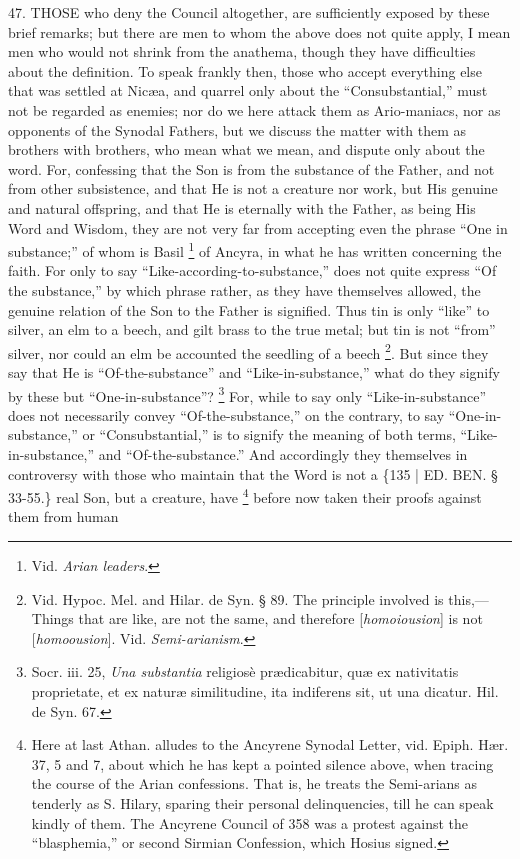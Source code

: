 47. THOSE
who deny the Council altogether, are sufficiently exposed by these
brief remarks; but there are men to whom the above does not quite
apply, I mean men who would not shrink from the anathema, though they
have difficulties about the definition. To speak frankly then, those
who accept everything else that was settled at Nicæa, and
quarrel only about the ``Consubstantial,'' must not be regarded as
enemies; nor do we here attack them as Ario-maniacs, nor as opponents
of the Synodal Fathers, but we discuss the matter with them as
brothers with brothers, who mean what we mean, and dispute only about
the word. For, confessing that the Son is from the substance of the
Father, and not from other subsistence, and that He is not a creature
nor work, but His genuine and natural offspring, and that He is
eternally with the Father, as being His Word and Wisdom, they are not
very far from accepting even the phrase ``One in substance;'' of whom is
Basil \footnote{Vid. \emph{Arian leaders}.} of Ancyra, in
what he has written concerning the faith. For only to say ``Like-according-to-substance,''
does not quite express ``Of the substance,'' by which phrase rather, as
they have themselves allowed, the genuine relation of the Son to the
Father is signified. Thus tin is only ``like'' to silver, an elm to a
beech, and gilt brass to the true metal; but tin is not ``from'' silver,
nor could an elm be accounted the seedling of a beech \footnote{Vid. Hypoc. Mel. and Hilar. de Syn. § 89. The principle involved is
this,—Things that are like, are not the same, and therefore [\emph{homoiousion}]
is not [\emph{homoousion}]. Vid. \emph{Semi-arianism}.}. But since they say that He is ``Of-the-substance'' and ``Like-in-substance,''
what do they signify by these but ``One-in-substance''? \footnote{Socr. iii. 25, \emph{Una substantia} religiosè prædicabitur, quæ ex
nativitatis proprietate, et ex naturæ similitudine, ita indiferens
sit, ut una dicatur. Hil. de Syn. 67.} For, while to say only ``Like-in-substance'' does not
necessarily convey ``Of-the-substance,'' on the contrary, to say ``One-in-substance,''
or ``Consubstantial,'' is to signify the meaning of both terms, ``Like-in-substance,''
and ``Of-the-substance.'' And accordingly they themselves in controversy
with those who maintain that the Word is not a \{135 | ED.
BEN.
§ 33-55.\} real Son, but a creature, have \footnote{Here at last Athan. alludes to the Ancyrene Synodal Letter, vid. Epiph.
Hær. 37, 5 and 7, about which he has kept a pointed silence above,
when tracing the course of the Arian confessions. That is, he treats
the Semi-arians as tenderly as S. Hilary, sparing their personal
delinquencies, till he can speak kindly of them. The Ancyrene Council
of 358 was a protest against the ``blasphemia,'' or second Sirmian
Confession, which Hosius signed.} before now taken their proofs against them from human
